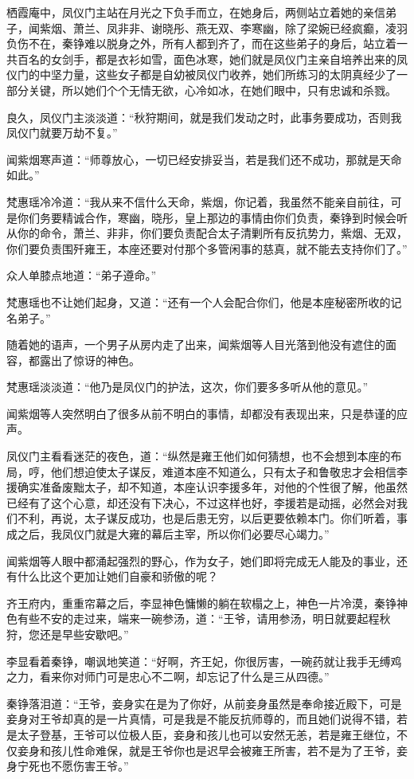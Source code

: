 栖霞庵中，凤仪门主站在月光之下负手而立，在她身后，两侧站立着她的亲信弟子，闻紫烟、萧兰、凤非非、谢晓彤、燕无双、李寒幽，除了梁婉已经疯癫，凌羽负伤不在，秦铮难以脱身之外，所有人都到齐了，而在这些弟子的身后，站立着一共百名的女剑手，都是衣衫如雪，面色冰寒，她们就是凤仪门主亲自培养出来的凤仪门的中坚力量，这些女子都是自幼被凤仪门收养，她们所练习的太阴真经少了一部分关键，所以她们个个无情无欲，心冷如冰，在她们眼中，只有忠诚和杀戮。

良久，凤仪门主淡淡道：“秋狩期间，就是我们发动之时，此事务要成功，否则我凤仪门就要万劫不复。”

闻紫烟寒声道：“师尊放心，一切已经安排妥当，若是我们还不成功，那就是天命如此。”

梵惠瑶冷冷道：“我从来不信什么天命，紫烟，你记着，我虽然不能亲自前往，可是你们务要精诚合作，寒幽，晓彤，皇上那边的事情由你们负责，秦铮到时候会听从你的命令，萧兰、非非，你们要负责配合太子清剿所有反抗势力，紫烟、无双，你们要负责围歼雍王，本座还要对付那个多管闲事的慈真，就不能去支持你们了。”

众人单膝点地道：“弟子遵命。”

梵惠瑶也不让她们起身，又道：“还有一个人会配合你们，他是本座秘密所收的记名弟子。”

随着她的语声，一个男子从房内走了出来，闻紫烟等人目光落到他没有遮住的面容，都露出了惊讶的神色。

梵惠瑶淡淡道：“他乃是凤仪门的护法，这次，你们要多多听从他的意见。”

闻紫烟等人突然明白了很多从前不明白的事情，却都没有表现出来，只是恭谨的应声。

凤仪门主看看迷茫的夜色，道：“纵然是雍王他们如何猜想，也不会想到本座的布局，哼，他们想迫使太子谋反，难道本座不知道么，只有太子和鲁敬忠才会相信李援确实准备废黜太子，却不知道，本座认识李援多年，对他的个性很了解，他虽然已经有了这个心意，却还没有下决心，不过这样也好，李援若是动摇，必然会对我们不利，再说，太子谋反成功，也是后患无穷，以后更要依赖本门。你们听着，事成之后，我凤仪门就是大雍的幕后主宰，所以你们必要尽心竭力。”

闻紫烟等人眼中都涌起强烈的野心，作为女子，她们即将完成无人能及的事业，还有什么比这个更加让她们自豪和骄傲的呢？

齐王府内，重重帘幕之后，李显神色慵懒的躺在软榻之上，神色一片冷漠，秦铮神色有些不安的走过来，端来一碗参汤，道：“王爷，请用参汤，明日就要起程秋狩，您还是早些安歇吧。”

李显看着秦铮，嘲讽地笑道：“好啊，齐王妃，你很厉害，一碗药就让我手无缚鸡之力，看来你对师门可是忠心不二啊，却忘记了什么是三从四德。”

秦铮落泪道：“王爷，妾身实在是为了你好，从前妾身虽然是奉命接近殿下，可是妾身对王爷却真的是一片真情，可是我是不能反抗师尊的，而且她们说得不错，若是太子登基，王爷可以位极人臣，妾身和孩儿也可以安然无恙，若是雍王继位，不仅妾身和孩儿性命难保，就是王爷你也是迟早会被雍王所害，若不是为了王爷，妾身宁死也不愿伤害王爷。”

